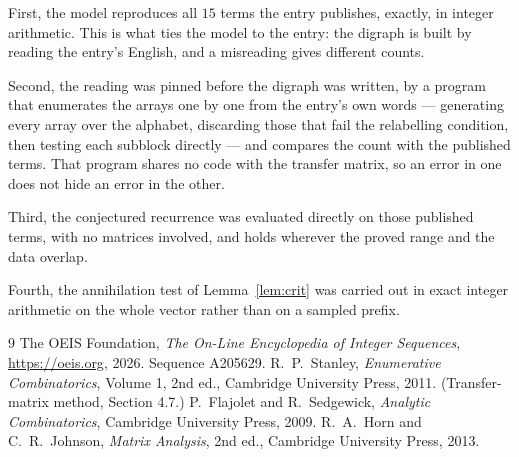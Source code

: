 \documentclass[11pt,a4paper]{article}
\theoremstyle{plain}
\theoremstyle{definition}
\begin{document}
First, the model reproduces all $15$ terms the entry publishes, exactly, in integer
arithmetic. This is what ties the model to the entry: the digraph is built by reading the
entry's English, and a misreading gives different counts.

Second, the reading was pinned before the digraph was written, by a program that enumerates
the arrays one by one from the entry's own words --- generating every array over the
alphabet, discarding those that fail the relabelling condition, then testing each subblock
directly --- and compares the count with the published terms. That program shares no code
with the transfer matrix, so an error in one does not hide an error in the other.

Third, the conjectured recurrence was evaluated directly on those published terms, with no
matrices involved, and holds wherever the proved range and the data overlap.

Fourth, the annihilation test of Lemma~\ref{lem:crit} was carried out in exact integer
arithmetic on the whole vector rather than on a sampled prefix.

\begin{thebibliography}{9}
 The OEIS Foundation, \emph{The On-Line Encyclopedia of Integer
Sequences}, \url{https://oeis.org}, 2026. Sequence A205629.
 R.~P.~Stanley, \emph{Enumerative Combinatorics}, Volume 1, 2nd ed.,
Cambridge University Press, 2011. (Transfer-matrix method, Section 4.7.)
 P.~Flajolet and R.~Sedgewick, \emph{Analytic Combinatorics}, Cambridge
University Press, 2009.
 R.~A.~Horn and C.~R.~Johnson, \emph{Matrix Analysis}, 2nd ed., Cambridge
University Press, 2013.
\end{thebibliography}
\end{document}
